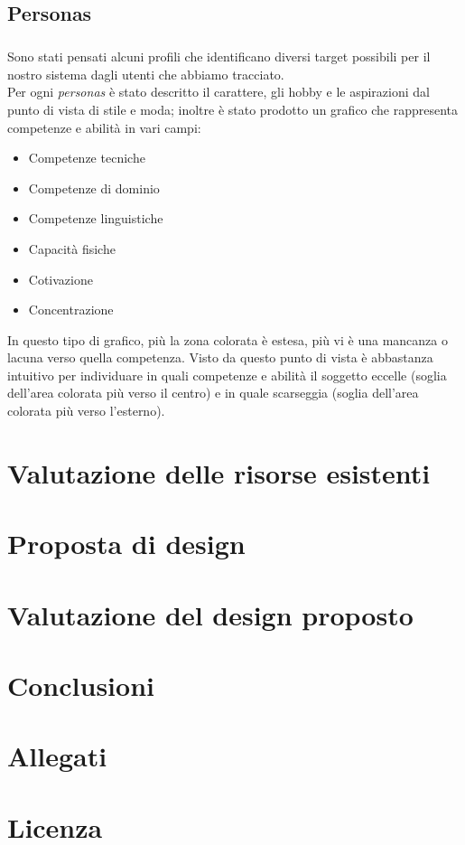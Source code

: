 \documentclass[12pt,a4paper]{report}
\begin{document}
\section{Personas}
\paragraph{}Sono stati pensati alcuni profili che identificano diversi target possibili per il nostro sistema dagli utenti che abbiamo tracciato.\\
Per ogni \textit{personas} è stato descritto il carattere, gli hobby e le aspirazioni dal punto di vista di stile e moda; inoltre è stato prodotto un grafico che rappresenta competenze e abilità in vari campi:
\begin{itemize}
  \item Competenze tecniche
  \item Competenze di dominio
  \item Competenze linguistiche
  \item Capacità fisiche
  \item Cotivazione
  \item Concentrazione
\end{itemize}
In questo tipo di grafico, più la zona colorata è estesa, più vi è una mancanza o lacuna verso quella competenza. Visto da questo punto di vista è abbastanza intuitivo per individuare in quali competenze e abilità il soggetto eccelle (soglia dell'area colorata più verso il centro) e in quale scarseggia (soglia dell'area colorata più verso l'esterno).

\chapter{Valutazione delle risorse esistenti}
\chapter{Proposta di design}
\chapter{Valutazione del design proposto}
\chapter{Conclusioni}
\chapter{Allegati}
\chapter{Licenza}
\end{document}
